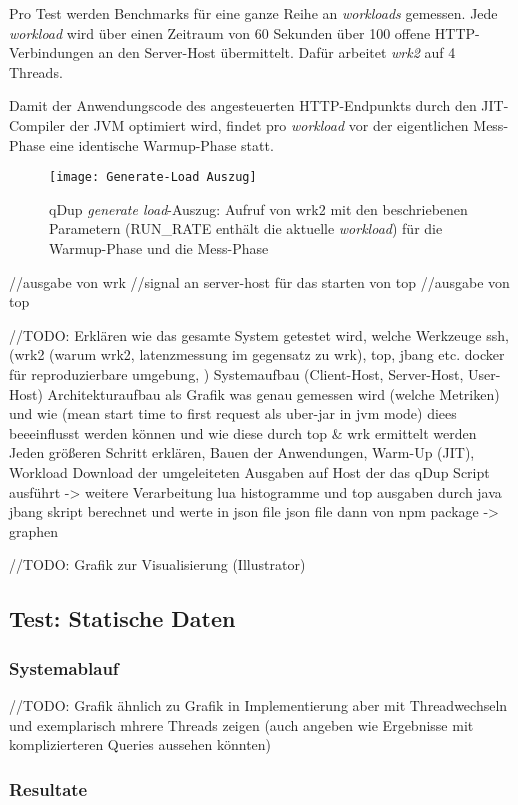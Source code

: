   Pro Test werden Benchmarks für eine ganze Reihe an \textit{workloads} gemessen.
  Jede \textit{workload} wird über einen Zeitraum von 60 Sekunden über 100 offene HTTP-Verbindungen an den Server-Host übermittelt.
  Dafür arbeitet \textit{wrk2} auf 4 Threads.
  
  Damit der Anwendungscode des angesteuerten HTTP-Endpunkts durch den JIT-Compiler der JVM optimiert wird, 
  findet pro \textit{workload} vor der eigentlichen Mess-Phase eine identische Warmup-Phase statt.
  \begin{figure}[h!]
    \centering
    \texttt{[image: Generate-Load Auszug]}
    \caption{qDup \textit{generate load}-Auszug: Aufruf von wrk2 mit den beschriebenen Parametern
     (RUN\_RATE enthält die aktuelle \textit{workload}) für die Warmup-Phase und die Mess-Phase}
  \end{figure} 

  //ausgabe von wrk
  //signal an server-host für das starten von top 
  //ausgabe von top
  
 //TODO: Erklären wie das gesamte System getestet wird, welche Werkzeuge ssh, (wrk2 (warum wrk2,
  latenzmessung im gegensatz zu wrk), top, jbang etc.
docker für reproduzierbare umgebung, )
Systemaufbau (Client-Host, Server-Host, User-Host)
Architekturaufbau als Grafik
was genau gemessen wird (welche Metriken) und wie (mean start time to first request als uber-jar in jvm mode)
diees beeeinflusst werden können und wie diese durch top \& wrk ermittelt werden
Jeden größeren Schritt erklären, Bauen der Anwendungen, Warm-Up (JIT), Workload
Download der umgeleiteten Ausgaben auf Host der das qDup Script ausführt -> weitere Verarbeitung
lua histogramme und top ausgaben durch java jbang skript berechnet und werte in json file 
json file dann von npm package -> graphen

//TODO: Grafik zur Visualisierung (Illustrator)
\subsection{Test: Statische Daten}
\label{section:statische_daten}

\subsubsection{Systemablauf}
//TODO: Grafik ähnlich zu Grafik in Implementierung aber mit Threadwechseln und exemplarisch mhrere Threads zeigen
(auch angeben wie Ergebnisse mit komplizierteren Queries aussehen könnten)
\subsubsection{Resultate}

